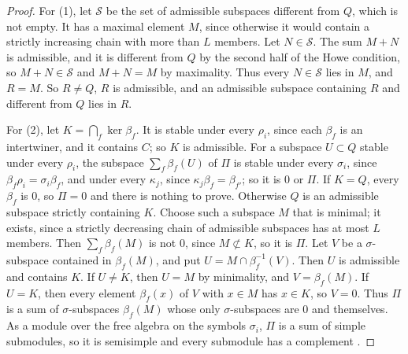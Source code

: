 \begin{proof}
For (1), let $\mathcal S$ be the set of admissible subspaces different from
$Q$, which is not empty. It has a maximal element $M$, since otherwise it would
contain a strictly increasing chain with more than $L$ members. Let
$N\in\mathcal S$. The sum $M+N$ is admissible, and it is different from $Q$ by
the second half of the Howe condition, so $M+N\in\mathcal S$ and $M+N=M$ by
maximality. Thus every $N\in\mathcal S$ lies in $M$, and $R=M$. So
$R\neq Q$, $R$ is admissible, and an admissible subspace containing $R$ and
different from $Q$ lies in $R$.

For (2), let $K=\bigcap_f\ker\beta_f$. It is stable under every $\rho_i$,
since each $\beta_f$ is an intertwiner, and it contains $C$; so $K$ is
admissible. For a subspace $U\subset Q$ stable under every $\rho_i$, the
subspace $\sum_f\beta_f(U)$ of $\Pi$ is stable under every $\sigma_i$, since
$\beta_f\rho_i=\sigma_i\beta_f$, and under every $\kappa_j$, since
$\kappa_j\beta_f=\beta_{f'}$; so it is $0$ or $\Pi$. If $K=Q$, every $\beta_f$
is $0$, so $\Pi=0$ and there is nothing to prove. Otherwise $Q$ is an
admissible subspace strictly containing $K$. Choose such a subspace $M$ that
is minimal; it exists, since a strictly decreasing chain of admissible
subspaces has at most $L$ members. Then $\sum_f\beta_f(M)$ is not $0$, since
$M\not\subset K$, so it is $\Pi$. Let $V$ be a $\sigma$-subspace contained in
$\beta_f(M)$, and put $U=M\cap\beta_f^{-1}(V)$. Then $U$ is admissible and
contains $K$. If $U\neq K$, then $U=M$ by minimality, and $V=\beta_f(M)$. If
$U=K$, then every element $\beta_f(x)$ of $V$ with $x\in M$ has $x\in K$, so
$V=0$. Thus $\Pi$ is a sum of $\sigma$-subspaces $\beta_f(M)$ whose only
$\sigma$-subspaces are $0$ and themselves. As a module over the free algebra
on the symbols $\sigma_i$, $\Pi$ is a sum of simple submodules, so it is
semisimple and every submodule has a complement \cite[\S2]{Lam01}.


\end{proof}
